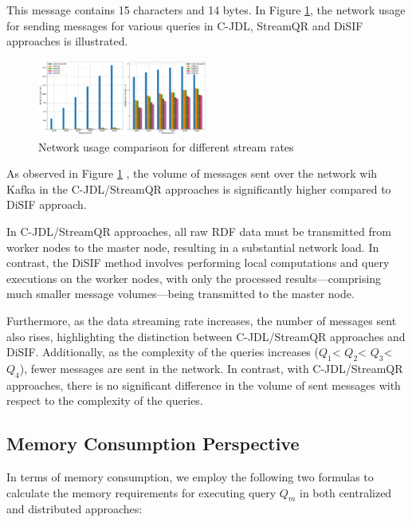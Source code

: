 \documentclass[5p,times]{elsarticle}
\begin{document}
\normalsize %


This message contains 15 characters and 14 bytes.
 In Figure \ref{fig:networkLoad}, the network usage
 for sending messages for various queries in C-JDL, StreamQR and DiSIF approaches is illustrated.




\begin{figure}[t]
  \centering
  \includegraphics[width=0.5\textwidth]{Network_Usage_vs_Log_vs_Triples.pdf}
  \caption{Network usage comparison for different stream rates}
  \label{fig:networkLoad}
\end{figure}




As observed in Figure \ref{fig:networkLoad} , the volume of messages sent over the 
network wih Kafka in the C-JDL/StreamQR approaches is significantly higher compared
 to DiSIF approach.


In C-JDL/StreamQR approaches, all raw RDF data must be transmitted from worker nodes to
 the master node, resulting in a substantial network load. 
In contrast, the DiSIF method involves performing local computations and query executions
 on the worker nodes, with only the processed results—comprising much smaller message
  volumes—being transmitted to the master node.

Furthermore, as the data streaming rate increases, the number of messages sent also rises,
 highlighting the distinction between C-JDL/StreamQR approaches and DiSIF. 
Additionally, as the complexity of the queries increases  ($Q_1$< $Q_2$< $Q_3$< $Q_4$),
 fewer messages are sent in the network. In contrast, with C-JDL/StreamQR approaches,
  there is no significant difference in the volume of sent messages with respect to the
   complexity of the queries.



\subsection{Memory Consumption Perspective}


In terms of memory consumption, we employ the following two formulas to calculate the memory requirements for executing query $Q_m$ in both centralized and distributed approaches:
\end{document}
